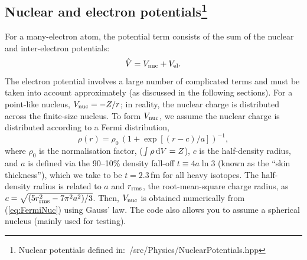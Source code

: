 \documentclass[10pt,twocolumn,a4paper]{article}%
\renewcommand{\v}[1]{\ensuremath{\boldsymbol{#1}}}		%
\newcommand{\be}{\begin{equation}}
\newcommand{\ee}{\end{equation}}
\def\d{\ensuremath{{\rm d}}}
\def\en{\ensuremath{\varepsilon}}
\renewcommand{\k}{\ensuremath{\kappa}}
\begin{document}

%


\subsection[Nuclear and electron potentials]{Nuclear and electron potentials\footnote{Nuclear potentials defined in:~/src/Physics/NuclearPotentials.hpp}}



For a many-electron atom, the potential term consists of the sum of the nuclear and inter-electron potentials:
\be
\hat V = V_{\rm nuc} + V_{\rm el}.
\ee
The electron potential
involves a large number of complicated terms and must be taken into account approximately
 (as discussed in the following sections).
For a point-like nucleus, $V_{\rm nuc} = -Z/r$;
in reality, the nuclear charge is distributed across the finite-size nucleus. %
%
To form $V_{\rm nuc}$, we assume the nuclear charge is distributed according to a Fermi distribution,
\begin{equation}\label{eq:FermiNuc}
\rho(r) = {\rho_0}\,{\left(1+\exp[(r-c)/a]\right)^{-1}},
\end{equation}
where $\rho_0$ is the normalisation factor,  ($\int\rho\,\d V = Z$),
$c$ is the half-density radius, and
$a$ is defined via the 90--10\% density fall-off {${t\equiv 4a\ln3}$} (known as the ``skin thickness''),
which we take to be $t=2.3$\,{\rm fm} for all heavy isotopes.
The half-density radius is related to $a$ and $r_{\rm rms}$, the root-mean-square charge radius, as $c = \sqrt{(5 r_{\rm rms}^2 -7\pi^2a^2)/3}$.
Then, $V_{\rm nuc}$ is obtained numerically from (\ref{eq:FermiNuc}) using Gauss' law.
The code also allows you to assume a spherical nucleus (mainly used for testing).

\end{document}
